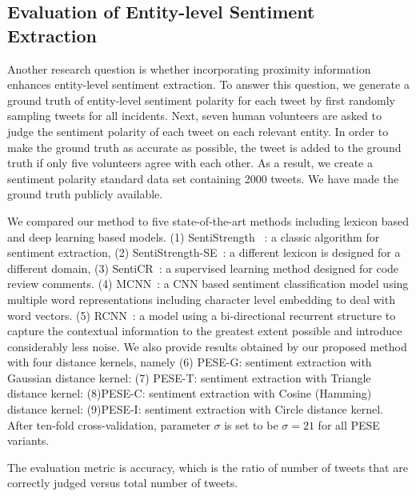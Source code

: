 \documentclass[runningheads]{llncs}
\begin{document}
\subsection{Evaluation of Entity-level Sentiment Extraction}\label{sec:Evaluation of Entity-level Sentiment Extraction}
Another research question is whether incorporating proximity information enhances entity-level sentiment extraction. To answer this question, we generate a ground truth of entity-level sentiment polarity for each tweet by first randomly sampling tweets 
for all incidents. Next, seven human volunteers are asked to judge the sentiment polarity of each tweet on each relevant entity. In order to make the ground truth as accurate as possible, the tweet is added to the ground truth if only five volunteers agree with each other. 
As a result, we create a sentiment polarity standard data set containing 2000 tweets.
We have made the ground truth publicly available. 

We compared our method to five state-of-the-art methods including lexicon based and deep learning based models. (1) SentiStrength ~\cite{sentistrength2010}: a classic algorithm for sentiment extraction, (2) SentiStrength-SE~\cite{Rakibul2017SentiStrength-SE}: a different lexicon is designed for a different domain, (3) SentiCR~\cite{Ahmed2017SentiCR}:  a supervised learning method designed for code review comments. (4) MCNN~\cite{JuMCNNsentimentclassification}: a CNN based sentiment classification model using multiple word representations including character level embedding to deal with word vectors. (5) RCNN~\cite{LaiRCNNsentimentclassification}: a model using a bi-directional recurrent structure to capture the contextual information to the greatest extent possible and introduce considerably less noise.
We also provide results obtained by our proposed method with four distance kernels, namely (6) PESE-G: sentiment extraction with Gaussian distance kernel: (7) PESE-T: sentiment extraction with Triangle distance kernel: (8)PESE-C: sentiment extraction with Cosine (Hamming) distance kernel: (9)PESE-I: sentiment extraction with Circle distance kernel. After ten-fold cross-validation, parameter $\sigma$ is set to be $\sigma=21$ for all PESE variants.

The evaluation metric is accuracy, which is the ratio of number of tweets that are correctly judged versus total number of tweets.
\end{document}

